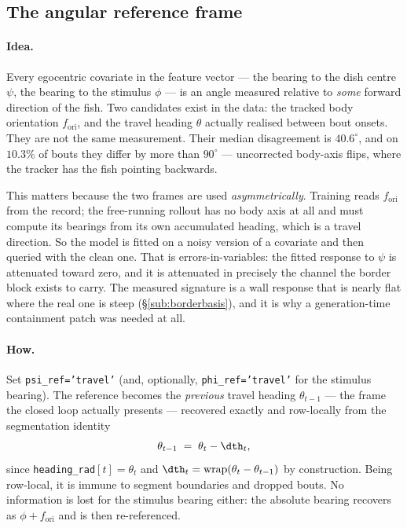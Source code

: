
\subsection{The angular reference frame}

\paragraph{Idea.} Every egocentric covariate in the feature vector --- the bearing to the dish
centre $\psi$, the bearing to the stimulus $\phi$ --- is an angle measured relative to \emph{some}
forward direction of the fish. Two candidates exist in the data: the tracked body orientation
$f_{\text{ori}}$, and the travel heading $\theta$ actually realised between bout onsets. They are
not the same measurement. Their median disagreement is $40.6^\circ$, and on $10.3\%$ of bouts they
differ by more than $90^\circ$ --- uncorrected body-axis flips, where the tracker has the fish
pointing backwards.

This matters because the two frames are used \emph{asymmetrically}. Training reads
$f_{\text{ori}}$ from the record; the free-running rollout has no body axis at all and must compute
its bearings from its own accumulated heading, which is a travel direction. So the model is fitted
on a noisy version of a covariate and then queried with the clean one. That is
errors-in-variables: the fitted response to $\psi$ is attenuated toward zero, and it is attenuated
in precisely the channel the border block exists to carry. The measured signature is a wall
response that is nearly flat where the real one is steep (\S\ref{sub:borderbasis}), and it is why
a generation-time containment patch was needed at all.

\paragraph{How.} Set \texttt{psi\_ref='travel'} (and, optionally, \texttt{phi\_ref='travel'} for
the stimulus bearing). The reference becomes the \emph{previous} travel heading
$\theta_{t-1}$ --- the frame the closed loop actually presents --- recovered exactly and row-locally
from the segmentation identity
\[
\theta_{t-1} \;=\; \theta_t - \dth_t ,
\]
since \texttt{heading\_rad}$[t]=\theta_t$ and $\dth_t=\mathrm{wrap}(\theta_t-\theta_{t-1})$ by
construction. Being row-local, it is immune to segment boundaries and dropped bouts. No information
is lost for the stimulus bearing either: the absolute bearing recovers as
$\phi + f_{\text{ori}}$ and is then re-referenced.

